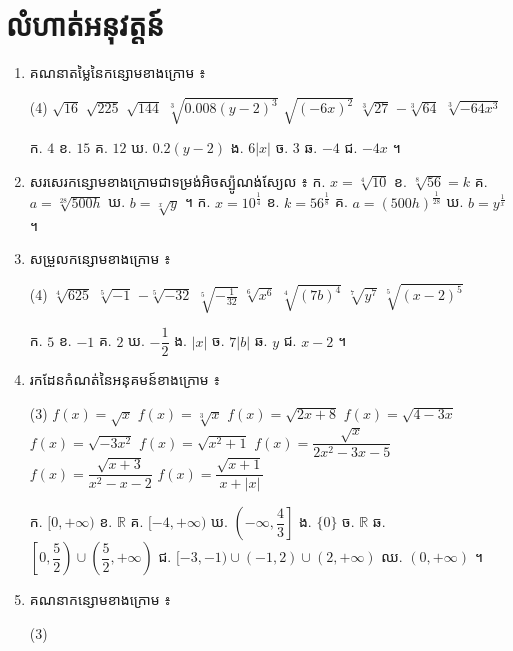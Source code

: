 \section*{លំហាត់អនុវត្តន៍}
\begin{enumerate}[1]
  \item គណនាតម្លៃនៃកន្សោមខាងក្រោម ៖
  \begin{tasks}(4)
    \task $\sqrt{16}$
    \task $\sqrt{225}$
    \task $\sqrt{144}$
    \task $\sqrt[3]{0.008(y-2)^3}$
    \task $\sqrt{(-6x)^2}$
    \task $\sqrt[3]{27}$
    \task $-\sqrt[3]{64}$
    \task $\sqrt[3]{-64x^3}$
  \end{tasks}
  \ans
  ក. $4$ \quad ខ. $15$ \quad គ. $12$ \quad ឃ. $0.2(y - 2)$ \quad ង. $6|x|$ \quad ច. $3$ \quad ឆ. $-4$ \quad ជ. $-4x$ ។
  \item សរសេរកន្សោមខាងក្រោមជាទម្រង់អិចស្ប៉ូណង់ស្យែល ៖ \quad ក. $x = \sqrt[4]{10}$ \quad ខ. $\sqrt[8]{56} = k$ \quad គ. $a = \sqrt[28]{500h}$ \quad ឃ. $b = \sqrt[x]{y}$ ។
  \ans
  ក. $x = 10^{\frac{1}{4}}$ \quad ខ. $k = 56^{\frac{1}{8}}$ \quad គ. $a = (500h)^{\frac{1}{28}}$ \quad ឃ. $b = y^{\frac{1}{x}}$ ។
  \item សម្រួលកន្សោមខាងក្រោម ៖
  \begin{tasks}(4)
    \task $\sqrt[4]{625}$
    \task $\sqrt[5]{-1}$
    \task $-\sqrt[5]{-32}$
    \task $\sqrt[5]{-\frac{1}{32}}$
    \task $\sqrt[6]{x^6}$
    \task $\sqrt[4]{(7b)^4}$
    \task $\sqrt[7]{y^7}$
    \task $\sqrt[5]{(x-2)^5}$
  \end{tasks}
  \ans
  ក. $5$ \quad ខ. $-1$ \quad គ. $2$ \quad ឃ. $-\dfrac{1}{2}$ \quad ង. $|x|$ \quad ច. $7|b|$ \quad ឆ. $y$ \quad ជ. $x - 2$ ។
  \item រកដែនកំណត់នៃអនុគមន៍ខាងក្រោម ៖
  \begin{tasks}(3)
    \task $f(x) = \sqrt{x}$
    \task $f(x) = \sqrt[3]{x}$
    \task $f(x) = \sqrt{2x + 8}$
    \task $f(x) = \sqrt{4 - 3x}$
    \task $f(x) = \sqrt{-3x^2}$
    \task $f(x) = \sqrt{x^2 + 1}$
    \task $f(x) = \dfrac{\sqrt{x}}{2x^2 - 3x - 5}$
    \task $f(x) = \dfrac{\sqrt{x + 3}}{x^2 - x - 2}$
    \task $f(x) = \dfrac{\sqrt{x + 1}}{x + |x|}$
  \end{tasks}
  \ans
  ក. $[0, +\infty)$ \quad ខ. $\mathbb{R}$ \quad គ. $[-4, +\infty)$ \quad ឃ. $\left(-\infty, \dfrac{4}{3}\right]$ \quad ង. $\{0\}$ \quad ច. $\mathbb{R}$ \quad ឆ. $\left[0, \dfrac{5}{2}\right) \cup \left(\dfrac{5}{2}, +\infty\right)$ \quad ជ. $[-3, -1) \cup (-1, 2) \cup (2, +\infty)$ \quad ឈ. $(0, +\infty)$ ។
  \item គណនាកន្សោមខាងក្រោម ៖
  \begin{tasks}(3)

\end{tasks}
\end{enumerate}
